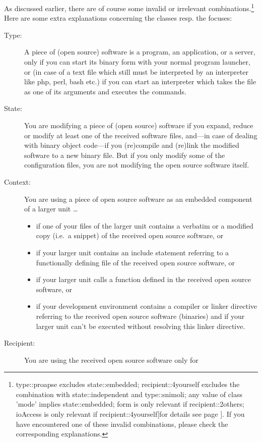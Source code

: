 As discussed earlier, there are of course some invalid or irrelevant
combinations.\footnote{type::proapse excludes state::embedded;
recipient::4yourself excludes the combination with state::independent and
type::snimoli; any value of class 'mode' implies state::embedded; form is only
relevant if recipient::2others; ioAccess is only relevant if
recipient::4yourself[for details see page
\pageref{InvalidFinderTokenCombinations}]. If you have encountered one of these
invalid combinations, please check the corresponding explanations.} Here are
some extra explanations concerning the classes resp. the focuses:

\begin{description}
\item[Type:] A piece of (open source) software is a program, an application, or
a server, only if you can start its binary form with your normal program
launcher, or (in case of a text file which still must be interpreted by an
interpreter like php, perl, bash etc.) if you can start an interpreter which
takes the file as one of its arguments and executes the commands.
\item[State:] You are modifying a piece of (open source) software if you expand,
reduce or modify at least one of the received software files, and---in case of
dealing with binary object code---if you (re)compile and (re)link the modified
software to a new binary file. But if you only modify some of the configuration
files, you are not modifying the open source software itself.
\item[Context:] You are using a piece of open source software as an embedded
component of a larger unit \ldots
  \begin{itemize}
  \item  if one of your files of the larger unit contains a verbatim or a
  modified copy (i.e.\ a snippet) of the received open source software, or
  \item if your larger unit contains an include statement referring to a
  functionally defining file of the received open source software, or
  \item if your larger unit calls a function defined in the received open source
  software, or
  \item if your development environment contains a compiler or linker directive
  referring to the received open source software (binaries) and if your larger
  unit can't be executed without resolving this linker directive.
  \end{itemize}
\item[Recipient:] You are using the received open source software only for

\end{description}
